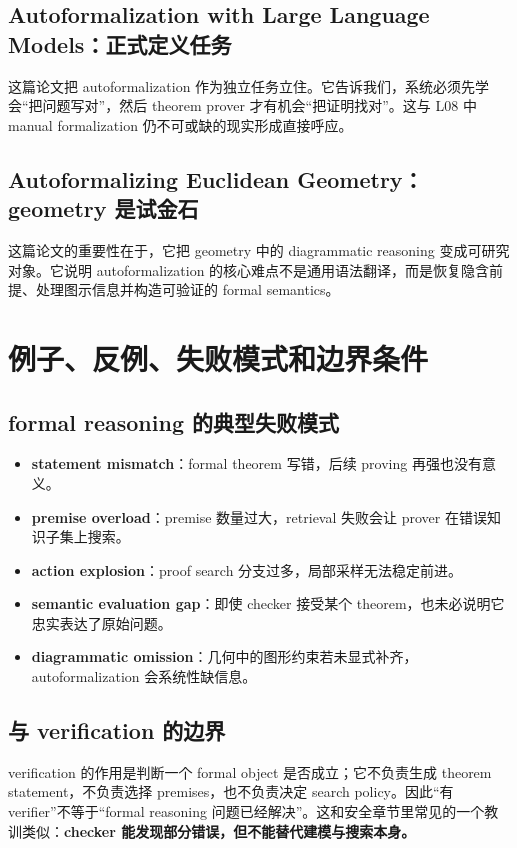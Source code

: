 \subsection{Autoformalization with Large Language Models：正式定义任务}

这篇论文把 autoformalization 作为独立任务立住。它告诉我们，系统必须先学会“把问题写对”，然后 theorem prover 才有机会“把证明找对”。这与 L08 中 manual formalization 仍不可或缺的现实形成直接呼应。

\subsection{Autoformalizing Euclidean Geometry：geometry 是试金石}

这篇论文的重要性在于，它把 geometry 中的 diagrammatic reasoning 变成可研究对象。它说明 autoformalization 的核心难点不是通用语法翻译，而是恢复隐含前提、处理图示信息并构造可验证的 formal semantics。

\section{例子、反例、失败模式和边界条件}

\subsection{formal reasoning 的典型失败模式}

\begin{itemize}
\item \textbf{statement mismatch}：formal theorem 写错，后续 proving 再强也没有意义。
\item \textbf{premise overload}：premise 数量过大，retrieval 失败会让 prover 在错误知识子集上搜索。
\item \textbf{action explosion}：proof search 分支过多，局部采样无法稳定前进。
\item \textbf{semantic evaluation gap}：即使 checker 接受某个 theorem，也未必说明它忠实表达了原始问题。
\item \textbf{diagrammatic omission}：几何中的图形约束若未显式补齐，autoformalization 会系统性缺信息。
\end{itemize}

\subsection{与 verification 的边界}

verification 的作用是判断一个 formal object 是否成立；它不负责生成 theorem statement，不负责选择 premises，也不负责决定 search policy。因此“有 verifier”不等于“formal reasoning 问题已经解决”。这和安全章节里常见的一个教训类似：\textbf{checker 能发现部分错误，但不能替代建模与搜索本身。}

